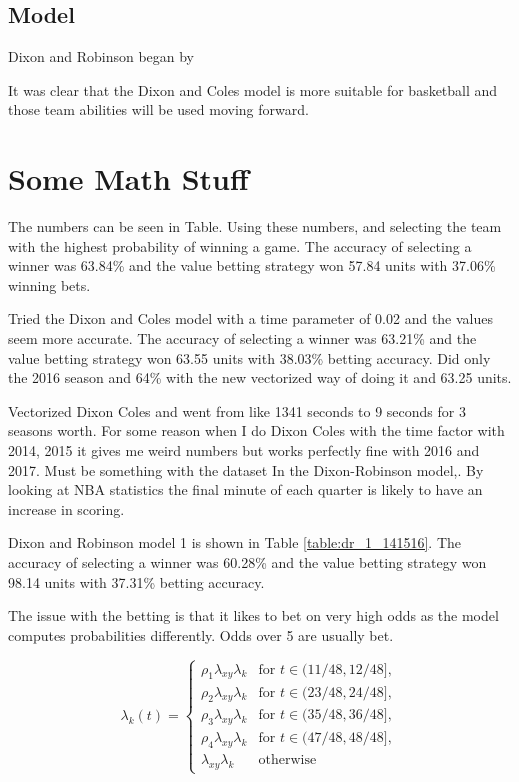 \subsection{Model}
Dixon and Robinson began by 

It was clear that the Dixon and Coles model is more suitable for basketball and those team abilities will be used moving forward.
\section{Some Math Stuff}
The numbers can be seen in Table.  Using these numbers, and selecting the team with the highest probability of winning a game.  The accuracy of selecting a winner was 63.84\% and the value betting strategy won 57.84 units with 37.06\% winning bets.

Tried the Dixon and Coles model with a time parameter of 0.02 and the values seem more accurate.  The accuracy of selecting a winner was 63.21\% and the value betting strategy won 63.55 units with 38.03\% betting accuracy.  Did only the 2016 season and 64\% with the new vectorized way of doing it and 63.25 units.

Vectorized Dixon Coles and went from like 1341 seconds to 9 seconds for 3 seasons worth.  For some reason when I do Dixon Coles with the time factor with 2014, 2015 it gives me weird numbers but works perfectly fine with 2016 and 2017.  Must be something with the dataset
In the Dixon-Robinson model,.  By looking at NBA statistics the final minute of each quarter is likely to have an increase in scoring.


Dixon and Robinson model 1 is shown in Table \ref{table:dr_1_141516}.  The accuracy of selecting a winner was 60.28\% and the value betting strategy won 98.14 units with 37.31\% betting accuracy.

The issue with the betting is that it likes to bet on very high odds as the model computes probabilities differently.  Odds over 5 are usually bet.


\begin{equation}
    \lambda_k(t) = 
    \begin{cases}
        \rho_{1}\lambda_{xy}\lambda_{k} & \text{for }t \in (11/48, 12/48],\\
        \rho_{2}\lambda_{xy}\lambda_{k} & \text{for }t \in (23/48, 24/48],\\
        \rho_{3}\lambda_{xy}\lambda_{k} & \text{for }t \in (35/48, 36/48],\\
        \rho_{4}\lambda_{xy}\lambda_{k} & \text{for }t \in (47/48, 48/48],\\
        \lambda_{xy}\lambda_{k} & \text{otherwise}
\end{cases}
\end{equation}

